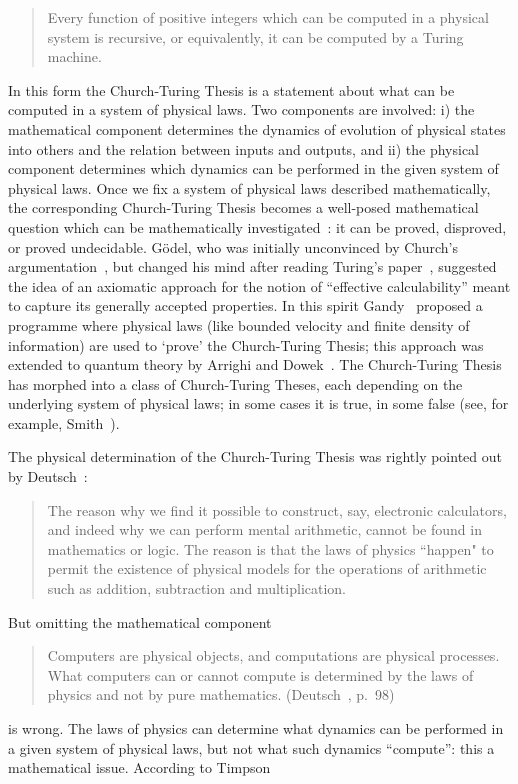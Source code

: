 \documentclass{comjnl}
\begin{document}
\begin{quote}
Every function  of positive integers which can be computed in a  physical system is recursive, or equivalently,  it can be computed by a Turing machine.
\end{quote}

 In this form the Church-Turing Thesis is a statement  about what can be computed in a system of physical laws. Two components are involved: i) the mathematical component  determines the dynamics of evolution of  physical states into others and the relation between inputs and outputs, and ii) the physical component determines which dynamics can be performed in  the given system of physical laws.  Once we fix a system of physical laws described mathematically, the corresponding Church-Turing Thesis becomes a well-posed mathematical question which can be mathematically investigated~\cite{yao-2003}: it can be proved, disproved, or proved undecidable.
 G\"odel, who was initially unconvinced by Church's argumentation~\cite{church30}, but changed his mind after reading Turing's paper~\cite{turing-36},  suggested the idea of an axiomatic approach for the notion of
``effective calculability'' meant to capture its generally accepted properties. In this spirit  Gandy~\cite{gandy2}
 proposed a programme where physical laws (like bounded velocity and finite density of information) are used to `prove' the Church-Turing Thesis; this approach was extended to quantum theory by Arrighi and Dowek~\cite{arrighi-dowek}.
  The
 Church-Turing Thesis has morphed into a class of Church-Turing Theses, each depending on the underlying system of physical laws;
 in some cases it is true, in some false (see, for example, Smith~\cite{Smith2006154}).

 The physical determination of the Church-Turing Thesis was rightly  pointed out by  Deutsch~\cite{deutsch}:
 \begin{quote}
The reason why we find it possible to construct, say, electronic
calculators, and indeed why we can perform mental arithmetic, cannot be
found in mathematics or logic. The reason is that the laws of
physics ``happen" to permit the existence of physical models for the
operations of arithmetic such as addition, subtraction and
multiplication.
\end{quote}

But omitting the mathematical component

\begin{quote}
Computers are physical objects, and computations are physical processes. What computers can or cannot
compute is determined by the laws of physics and not by pure mathematics. (Deutsch~\cite{deutsch-1997}, p.\ 98)
\end{quote}
is wrong. The laws of physics can determine what dynamics can be performed in a given  system of physical laws, but not what
such dynamics ``compute'': this  a mathematical issue. According to Timpson~\cite{timpson-2004}
\end{document}
